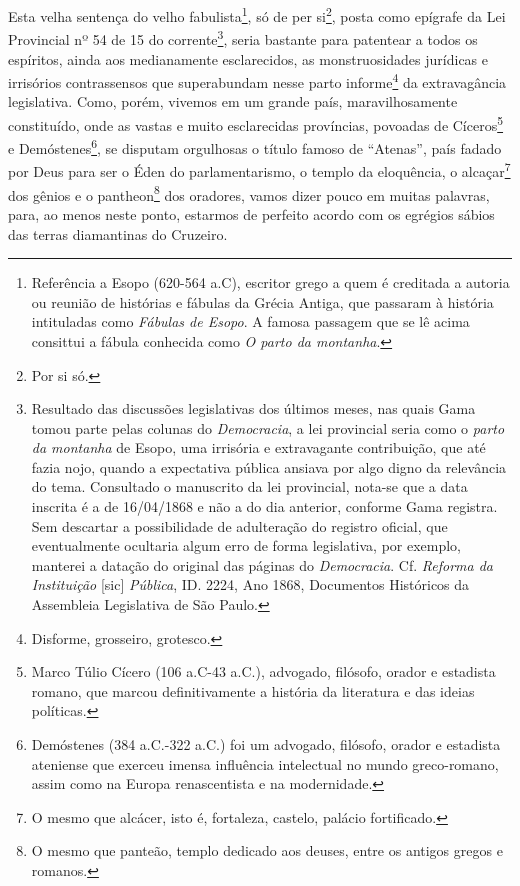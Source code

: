 Esta velha sentença do velho fabulista\footnote{Referência a Esopo
  (620-564 a.C), escritor grego a quem é creditada a autoria ou reunião
  de histórias e fábulas da Grécia Antiga, que passaram à história
  intituladas como \emph{Fábulas de Esopo}. A famosa passagem que se lê
  acima consittui a fábula conhecida como \emph{O parto da montanha}.},
só de per si\footnote{Por si só.}, posta como epígrafe da Lei
Provincial nº 54 de 15 do corrente\footnote{Resultado das discussões
  legislativas dos últimos meses, nas quais Gama tomou parte pelas
  colunas do \emph{Democracia}, a lei provincial seria como o
  \emph{parto da montanha} de Esopo, uma irrisória e extravagante
  contribuição, que até fazia nojo, quando a expectativa pública ansiava
  por algo digno da relevância do tema. Consultado o manuscrito da lei
  provincial, nota-se que a data inscrita é a de 16/04/1868 e não a do
  dia anterior, conforme Gama registra. Sem descartar a possibilidade de
  adulteração do registro oficial, que eventualmente ocultaria algum
  erro de forma legislativa, por exemplo, manterei a datação do original
  das páginas do \emph{Democracia}. Cf. \emph{Reforma da Instituição}
  {[}sic{]} \emph{Pública}, ID. 2224, Ano 1868, Documentos Históricos da
  Assembleia Legislativa de São Paulo.}, seria bastante para patentear a
todos os espíritos, ainda aos medianamente esclarecidos, as
monstruosidades jurídicas e irrisórios contrassensos que superabundam
nesse parto informe\footnote{Disforme, grosseiro, grotesco.} da
extravagância legislativa. Como, porém, vivemos em um grande país,
maravilhosamente constituído, onde as vastas e muito esclarecidas
províncias, povoadas de Cíceros\footnote{Marco Túlio Cícero (106
  a.C-43 a.C.), advogado, filósofo, orador e estadista romano, que
  marcou definitivamente a história da literatura e das ideias
  políticas.} e Demóstenes\footnote{Demóstenes (384 a.C.-322 a.C.) foi
  um advogado, filósofo, orador e estadista ateniense que exerceu imensa
  influência intelectual no mundo greco-romano, assim como na Europa
  renascentista e na modernidade.}, se disputam orgulhosas o título
famoso de ``Atenas'', país fadado por Deus para ser o Éden do
parlamentarismo, o templo da eloquência, o alcaçar\footnote{O mesmo
  que alcácer, isto é, fortaleza, castelo, palácio fortificado.} dos
gênios e o pantheon\footnote{O mesmo que panteão, templo dedicado aos
  deuses, entre os antigos gregos e romanos.} dos oradores, vamos dizer
pouco em muitas palavras, para, ao menos neste ponto, estarmos de
perfeito acordo com os egrégios sábios das terras diamantinas do
Cruzeiro.

